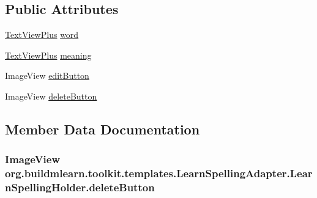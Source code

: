 \subsection*{Public Attributes}
\begin{DoxyCompactItemize}
\item 
\hyperlink{classorg_1_1buildmlearn_1_1toolkit_1_1views_1_1TextViewPlus}{Text\+View\+Plus} \hyperlink{classorg_1_1buildmlearn_1_1toolkit_1_1templates_1_1LearnSpellingAdapter_1_1LearnSpellingHolder_a6e8838ae9bf29b6005fe9fff6a174e77}{word}
\item 
\hyperlink{classorg_1_1buildmlearn_1_1toolkit_1_1views_1_1TextViewPlus}{Text\+View\+Plus} \hyperlink{classorg_1_1buildmlearn_1_1toolkit_1_1templates_1_1LearnSpellingAdapter_1_1LearnSpellingHolder_afbe6d699245b23d551f1bf5105e842a6}{meaning}
\item 
Image\+View \hyperlink{classorg_1_1buildmlearn_1_1toolkit_1_1templates_1_1LearnSpellingAdapter_1_1LearnSpellingHolder_a5db8d3295fb4eee7a87b536b32ad4082}{edit\+Button}
\item 
Image\+View \hyperlink{classorg_1_1buildmlearn_1_1toolkit_1_1templates_1_1LearnSpellingAdapter_1_1LearnSpellingHolder_a89783eb886d6820d344f9e3e3075480a}{delete\+Button}
\end{DoxyCompactItemize}


\subsection{Member Data Documentation}
\subsubsection[{\texorpdfstring{delete\+Button}{deleteButton}}]{\setlength{\rightskip}{0pt plus 5cm}Image\+View org.\+buildmlearn.\+toolkit.\+templates.\+Learn\+Spelling\+Adapter.\+Learn\+Spelling\+Holder.\+delete\+Button}\hypertarget{classorg_1_1buildmlearn_1_1toolkit_1_1templates_1_1LearnSpellingAdapter_1_1LearnSpellingHolder_a89783eb886d6820d344f9e3e3075480a}{}\label{classorg_1_1buildmlearn_1_1toolkit_1_1templates_1_1LearnSpellingAdapter_1_1LearnSpellingHolder_a89783eb886d6820d344f9e3e3075480a}
